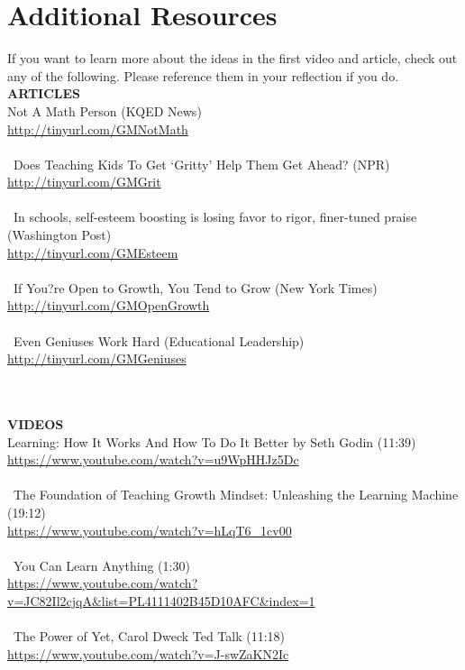 \documentclass{article}
\begin{document}
\section*{Additional Resources}
If you want to learn more about the ideas in the first video and article, check out any of the following. Please reference them in your reflection if you do.\\

\noindent\textbf{ARTICLES}\\
Not A Math Person (KQED News)\\
\href{https://ww2.kqed.org/mindshift/2015/11/30/not-a-math-person-how-to-remove-obstacles-to-learning-math/}{http://tinyurl.com/GMNotMath}\\\\\
Does Teaching Kids To Get `Gritty' Help Them Get Ahead? (NPR)\\
\href{http://www.npr.org/sections/ed/2014/03/17/290089998/does-teaching-kids-to-get-gritty-help-them-get-ahead}{http://tinyurl.com/GMGrit}\\\\\
In schools, self-esteem boosting is losing favor to rigor, finer-tuned praise (Washington Post)\\
\href{http://tinyurl.com/GMEsteem}{http://tinyurl.com/GMEsteem}\\\\\
If You?re Open to Growth, You Tend to Grow (New York Times)\\
\href{http://tinyurl.com/GMOpenGrowth}{http://tinyurl.com/GMOpenGrowth}\\\\\
Even Geniuses Work Hard (Educational Leadership)\\
\href{http://www.ascd.org/publications/educational-leadership/sept10/vol68/num01/Even-Geniuses-Work-Hard.aspx}{http://tinyurl.com/GMGeniuses}\\\\\

\noindent\textbf{VIDEOS}\\
Learning: How It Works And How To Do It Better by Seth Godin (11:39)\\
\url{https://www.youtube.com/watch?v=u9WpHHJz5Dc}\\\\\
The Foundation of Teaching Growth Mindset: Unleashing the Learning Machine (19:12)\\
\url{https://www.youtube.com/watch?v=hLqT6_1cv00}\\\\\
You Can Learn Anything (1:30) \\
\url{https://www.youtube.com/watch?v=JC82Il2cjqA&list=PL4111402B45D10AFC&index=1}\\\\\
The Power of Yet, Carol Dweck Ted Talk (11:18)\\
\url{https://www.youtube.com/watch?v=J-swZaKN2Ic}\\
\end{document}
